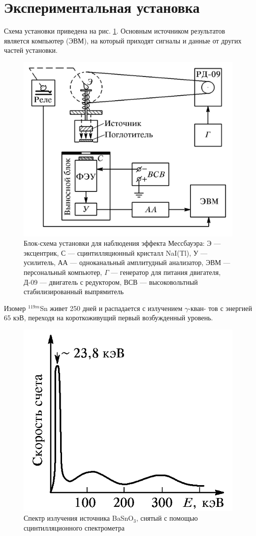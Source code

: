 \documentclass[12pt]{kiarticle}
\begin{document}
	\section{Экспериментальная установка}
	
	Схема установки приведена на рис. \ref{lab}. Основным источником результатов является компьютер (ЭВМ), на который приходят сигналы и данные от других частей установки. 
	
	\begin{figure}[h!]
		\centering
		\includegraphics[width=0.7\linewidth]{lab}
		\caption{Блок-схема установки для наблюдения эффекта Мессбауэра: Э --- эксцентрик, С --- сцинтилляционный кристалл NaI(Tl), У --- усилитель, АА --- одноканальный амплитудный анализатор, ЭВМ --- персональный компьютер, $ \Gamma $ --- генератор для питания двигателя, Д-09 --- двигатель с редуктором, ВСВ --- высоковольтный стабилизированный выпрямитель}
		\label{lab}
	\end{figure}
	
	Изомер $^{119m}$Sn живет 250
	дней и распадается с излучением $ \gamma $-кван-
	тов с энергией 65 кэВ, переходя на короткоживущий первый возбужденный уровень.
	
	\begin{figure}
		\includegraphics[width=\linewidth]{spek_lab}
		\caption{Спектр излучения источника BaSnO$_3 $, снятый с
			помощью сцинтилляционного спектрометра}
		\label{spek_lab}
	\end{figure}
	
\end{document}
